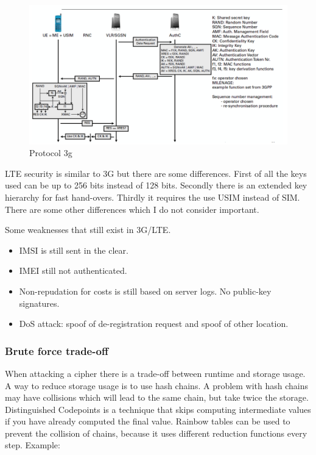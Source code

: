 \documentclass{article}
\begin{document}
\begin{figure}[!h]
\centering
\includegraphics[width=\textwidth, height=\textheight, keepaspectratio]{images/3gprotocol.png}
\caption{Protocol 3g}
\label{fig:3gprotocol}
\end{figure}

LTE security is similar to 3G but there are some differences. First of all the keys used can be up to 256 bits instead of 128 bits. Secondly there is an extended key hierarchy for fast hand-overs. Thirdly it requires the use USIM instead of SIM. There are some other differences which I do not consider important.

Some weaknesses that still exist in 3G/LTE.

\begin{itemize}
\item IMSI is still sent in the clear.
\item IMEI still not authenticated.
\item Non-repudation for costs is still based on server logs. No public-key signatures.
\item DoS attack: spoof of de-registration request and spoof of other location.
\end{itemize}

\subsubsection*{Brute force trade-off}
When attacking a cipher there is a trade-off between runtime and storage usage. A way to reduce storage usage is to use hash chains. A problem with hash chains may have collisions which will lead to the same chain, but take twice the storage. Distinguished Codepoints is a technique that skips computing intermediate values if you have already computed the final value. Rainbow tables can be used to prevent the collision of chains, because it uses different reduction functions every step. Example:
\end{document}
